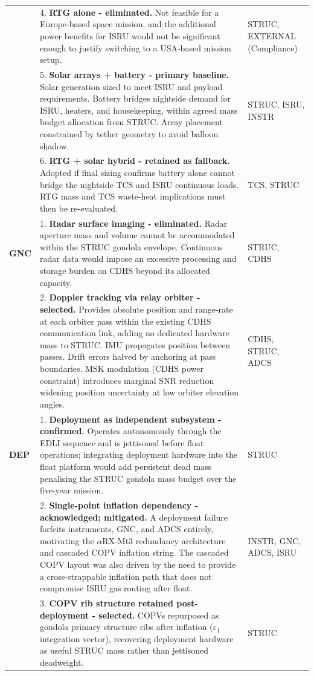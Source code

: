 {\begin{longtable}{@{} p{1.8cm} p{11cm} p{2.5cm} @{}}
&
4. \textbf{RTG alone - eliminated.} Not feasible for a Europe-based space mission, and the additional power benefits for ISRU would not be significant enough to justify switching to a USA-based mission setup.
& STRUC, EXTERNAL (Compliance) \\[6pt]

&
5. \textbf{Solar arrays + battery - primary baseline.} Solar generation sized to meet ISRU and payload requirements. Battery bridges nightside demand for ISRU, heaters, and housekeeping, within agreed mass budget allocation from STRUC. Array placement constrained by tether geometry to avoid balloon shadow.
& STRUC, ISRU, INSTR \\[6pt]

&
6. \textbf{RTG + solar hybrid - retained as fallback.} Adopted if final sizing confirms battery alone cannot bridge the nightside TCS and ISRU continuous loads. RTG mass and TCS waste-heat implications must then be re-evaluated.
& TCS, STRUC \\[6pt]
\midrule
\textbf{GNC} &
1. \textbf{Radar surface imaging - eliminated.} Radar aperture mass and volume cannot be accommodated within the STRUC gondola envelope. Continuous radar data would impose an excessive processing and storage burden on CDHS beyond its allocated capacity.
& STRUC, CDHS \\[6pt]

&
2. \textbf{Doppler tracking via relay orbiter - selected.} Provides absolute position and range-rate at each orbiter pass within the existing CDHS communication link, adding no dedicated hardware mass to STRUC. IMU propagates position between passes. Drift errors halved by anchoring at pass boundaries. MSK modulation (CDHS power constraint) introduces marginal SNR reduction widening position uncertainty at low orbiter elevation angles.
& CDHS, STRUC, ADCS \\[6pt]
\midrule
\textbf{DEP} &
1. \textbf{Deployment as independent subsystem - confirmed.} Operates autonomously through the EDLI sequence and is jettisoned before float operations; integrating deployment hardware into the float platform would add persistent dead mass penalising the STRUC gondola mass budget over the five-year mission.
& STRUC \\[6pt]

&
2. \textbf{Single-point inflation dependency - acknowledged; mitigated.} A deployment failure forfeits instruments, GNC, and ADCS entirely, motivating the $\alpha$RX-Mt3 redundancy architecture and cascaded COPV inflation string. The cascaded COPV layout was also driven by the need to provide a cross-strappable inflation path that does not compromise ISRU gas routing after float.
& INSTR, GNC, ADCS, ISRU \\[6pt]

&
3. \textbf{COPV rib structure retained post-deployment - selected.} COPVs repurposed as gondola primary structure ribs after inflation ($\varepsilon_1$ integration vector), recovering deployment hardware as useful STRUC mass rather than jettisoned deadweight.
& STRUC \\

\end{longtable}
}

